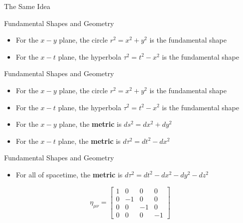 \documentclass[10pt,xcolor={table,dvipsnames},t]{beamer}
\begin{document}
\begin{frame}{The Same Idea}
    \begin{figure}[H]
    \centering
\end{figure}
\end{frame}

\begin{frame}{Fundamental Shapes and Geometry}
    \begin{itemize}
        \item For the $x-y$ plane, the circle $r^2 = x^2+y^2$ is the fundamental shape
        \item For the $x-t$ plane, the hyperbola $\tau^2 = t^2-x^2$ is the fundamental shape
    \end{itemize}
\end{frame}

\begin{frame}{Fundamental Shapes and Geometry}
    \begin{itemize}
        \item For the $x-y$ plane, the circle $r^2 = x^2+y^2$ is the fundamental shape
        \item For the $x-t$ plane, the hyperbola $\tau^2 = t^2-x^2$ is the fundamental shape
        \item For the $x-y$ plane, the \textbf{metric} is $ds^2 = dx^2 + dy^2$
        \item For the $x-t$ plane, the \textbf{metric} is $d\tau^2 = dt^2 - dx^2$
    \end{itemize}
\end{frame}

\begin{frame}{Fundamental Shapes and Geometry}
    \begin{itemize}
        \item For all of spacetime, the \textbf{metric} is $d\tau^2 = dt^2 - dx^2 - dy^2 - dz^2$
    \end{itemize}
    
    \begin{equation*}
        \eta_{\mu \nu} = \begin{bmatrix}1 & 0 & 0 & 0 \\ 0 & -1 & 0 & 0 \\ 0 & 0 & -1 & 0 \\ 0 & 0 & 0 & -1 \end{bmatrix}
    \end{equation*}
\end{frame}
\end{document}
